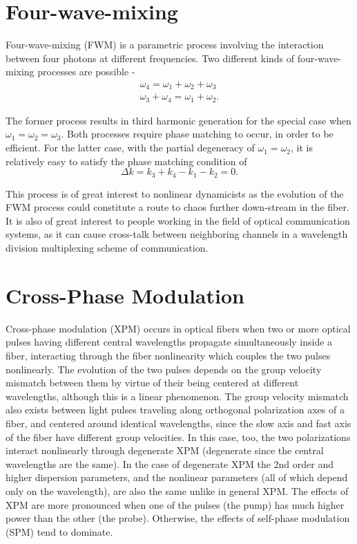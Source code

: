 \section{Four-wave-mixing}

Four-wave-mixing (FWM) \cite{Agrawal10} is a parametric process involving
the interaction
between four photons at different frequencies. Two different kinds of
four-wave-mixing processes are possible -
\begin{eqnarray}
\omega_4 = \omega_1 + \omega_2 + \omega_3 \\
\omega_3 + \omega_4 = \omega_1 + \omega_2 .
\end{eqnarray}

The former process results in third harmonic generation for the special case
when $\omega_1 = \omega_2 = \omega_3$. Both processes require phase
matching to occur, in order to be efficient. For the latter case, with
the partial degeneracy of $\omega_1 = \omega_2$, it is relatively easy
to satisfy the phase matching condition of
\begin{equation}
\Delta k = k_3 + k_4 - k_1 - k_2 = 0 .
\end{equation}

This process is of great interest to nonlinear dynamicists as the
evolution of the FWM process could constitute a route to chaos further
down-stream in the fiber. It is also of great interest to people working in
the field of optical communication systems, as it can cause cross-talk
between neighboring channels in a wavelength division multiplexing scheme
of communication.

\section{Cross-Phase Modulation}

Cross-phase modulation (XPM) \cite{Agrawal7} occurs in optical fibers when
two or more optical pulses having different central wavelengths propagate
simultaneously inside a fiber, interacting through the fiber
nonlinearity which couples the two pulses nonlinearly.  The evolution of the
two pulses depends on the group velocity mismatch between them by virtue of
their being centered at different wavelengths, although this is a linear
phenomenon. The group velocity mismatch also exists between light pulses
traveling along orthogonal polarization axes of a fiber, and centered around
identical wavelengths, since the slow axis and fast axis of the fiber have
different group velocities. In this case, too, the two polarizations interact
nonlinearly \cite{Agrawal6} through degenerate XPM (degenerate since the
central wavelengths are the same). In the case of degenerate XPM the 2nd order
and higher dispersion parameters, and the nonlinear parameters (all of which
depend only on the wavelength), are also the same unlike in general XPM. The effects of XPM are more pronounced when one of the pulses (the pump) has much higher power than the other (the probe). Otherwise, the effects of self-phase modulation (SPM) tend to dominate.

